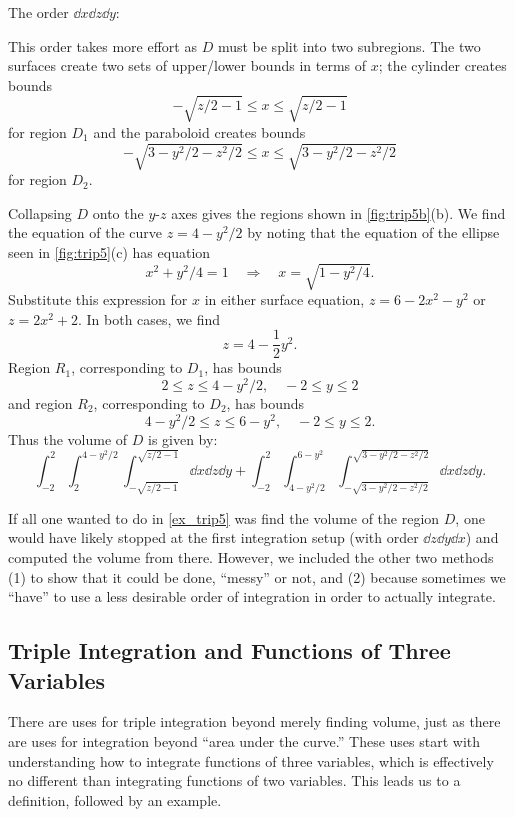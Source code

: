 \begin{example}
\noindent The order $\dd x\dd z\dd y$:\bigskip

This order takes more effort as $D$ must be split into two subregions. The two surfaces create two sets of upper/lower bounds in terms of $x$; the cylinder creates bounds
\[-\sqrt{z/2-1}\leq x\leq \sqrt{z/2-1}\]
for region $D_1$  and the paraboloid creates bounds
\[-\sqrt{3-y^2/2-z^2/2}\leq x\leq \sqrt{3-y^2/2-z^2/2}\]
for region $D_2$.

Collapsing $D$ onto the $y$-$z$ axes gives the regions shown in \autoref{fig:trip5b}(b). We find the equation of the curve $z=4-y^2/2$ by noting that the equation of the ellipse seen in \autoref{fig:trip5}(c) has equation 
\[x^2+y^2/4=1 \quad \Rightarrow \quad x = \sqrt{1-y^2/4}.\]  
Substitute this expression for $x$ in either surface equation, $z=6-2x^2-y^2$ or $z=2x^2+2$. In both cases, we find
\[z=4-\frac12y^2.\]
Region $R_1$, corresponding to $D_1$, has bounds
\[2\leq z\leq 4-y^2/2,\quad -2\leq y\leq 2\]
and region $R_2$, corresponding to $D_2$, has bounds
\[4-y^2/2\leq z\leq 6-y^2,\quad -2\leq y\leq 2.\]
Thus the volume of $D$ is given by:
\[\int_{-2}^2\int_2^{4-y^2/2}\int_{-\sqrt{z/2-1}}^{\sqrt{z/2-1}}\dd x\dd z\dd y +\int_{-2}^2\int_{4-y^2/2}^{6-y^2}\int_{-\sqrt{3-y^2/2-z^2/2}}^{\sqrt{3-y^2/2-z^2/2}}\dd x\dd z\dd y.\]
\end{example}

If all one wanted to do in \autoref{ex_trip5} was find the volume of the region $D$, one would have likely stopped at the first integration setup (with order $\dd z\dd y\dd x$) and computed the volume from there. However, we included the other two methods (1) to show that it could be done, ``messy'' or not, and (2) because sometimes we ``have'' to use a less desirable order of integration in order to actually integrate.

\subsection{Triple Integration and Functions of Three Variables}

There are uses for triple integration beyond merely finding volume, just as there are uses for integration beyond ``area under the curve.'' These uses start with understanding how to integrate functions of three variables, which is effectively no different than integrating functions of two variables. This leads us to a definition, followed by an example.

